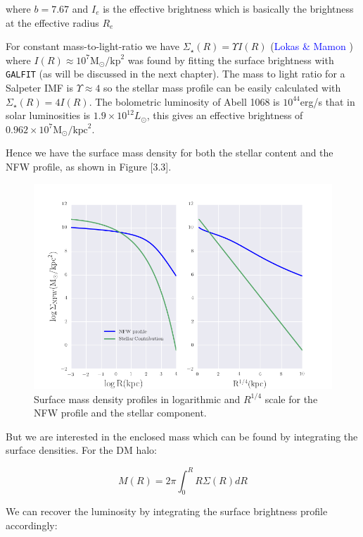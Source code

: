 where $b=7.67$ and $I_{e}$ is the effective brightness which is basically the brightness at the effective radius $R_{e}$

For constant mass-to-light-ratio we have $\Sigma_{\star}(R)= \Upsilon I(R)$ (\textcolor{blue}{Lokas \& Mamon} \citeyear{Reference14}) where  $I(R)\approx 10^{7} \text{M}_{\odot}/\text{kp}^{2}$ was found by fitting the surface brightness with \texttt{GALFIT} (as will be discussed in the next chapter). The mass to light ratio for a Salpeter IMF is $\Upsilon\approx 4$ so the stellar mass profile can be easily calculated with  $\Sigma_{\star}(R)= 4I(R)$. The bolometric luminosity of Abell 1068 is $10^{44}$erg/s that in solar luminosities is $1.9\times 10^{12} L_{\odot}$, this gives an effective brightness of $0.962\times 10^{7}\text{M}_{\odot}/\text{kpc}^2$. 

Hence we have the surface mass density for both the stellar content and the NFW profile, as shown in Figure [3.3].

\begin{figure}[H]
\centering
\includegraphics[width=12cm]{images/Surface_mass_density_log.png}
\caption[Surface mass density profiles]{Surface mass density profiles in logarithmic and $R^{1/4}$ scale for the NFW profile and the stellar component.}
\end{figure}

But we are interested in the enclosed mass which can be found by integrating the surface densities. For the DM halo:

\begin{equation}
M(R)=2\pi \int_{0}^{R} R\Sigma(R)dR
\end{equation}

We can recover the luminosity by integrating the surface brightness profile accordingly:

